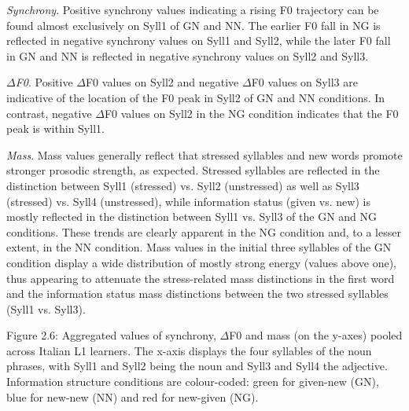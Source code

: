 \begin{listWWNumiiileveli}
\item 
\begin{stylelsBulletList}
\textit{Synchrony}. Positive synchrony values indicating a rising F0 trajectory can be found almost exclusively on Syll1 of GN and NN. The earlier F0 fall in NG is reflected in negative synchrony values on Syll1 and Syll2, while the later F0 fall in GN and NN is reflected in negative synchrony values on Syll2 and Syll3.
\end{stylelsBulletList}
\item 
\begin{stylelsBulletList}
\textit{${\Delta}$F0}. Positive ${\Delta}$F0 values on Syll2 and negative ${\Delta}$F0 values on Syll3 are indicative of the location of the F0 peak in Syll2 of GN and NN conditions. In contrast, negative ${\Delta}$F0 values on Syll2 in the NG condition indicates that the F0 peak is within Syll1.
\end{stylelsBulletList}
\item 
\begin{stylelsBulletList}
\textit{Mass}. Mass values generally reflect that stressed syllables and new words promote stronger prosodic strength, as expected. Stressed syllables are reflected in the distinction between Syll1 (stressed) vs. Syll2 (unstressed) as well as Syll3 (stressed) vs. Syll4 (unstressed), while information status (given vs. new) is mostly reflected in the distinction between Syll1 vs. Syll3 of the GN and NG conditions. These trends are clearly apparent in the NG condition and, to a lesser extent, in the NN condition. Mass values in the initial three syllables of the GN condition display a wide distribution of mostly strong energy (values above one), thus appearing to attenuate the stress-related mass distinctions in the first word and the information status mass distinctions between the two stressed syllables (Syll1 vs. Syll3).
\end{stylelsBulletList}
\end{listWWNumiiileveli}
\begin{styleStandard}
  [Warning: Image ignored] %
 
\end{styleStandard}

\begin{stylecaption}
Figure 2.6: Aggregated values of synchrony, ${\Delta}$F0 and mass (on the y-axes) pooled across Italian L1 learners. The x-axis displays the four syllables of the noun phrases, with Syll1 and Syll2 being the noun and Syll3 and Syll4 the adjective. Information structure conditions are colour-coded: green for given-new (GN), blue for new-new (NN) and red for new-given (NG). 
\end{stylecaption}

